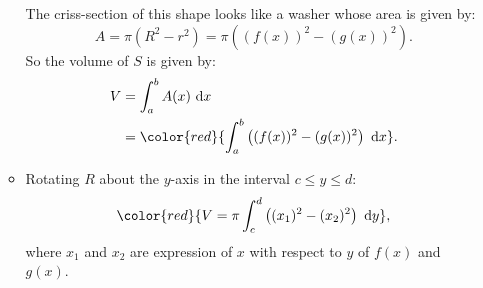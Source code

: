 \documentclass[12pt, a4paper]{article}
\def\d{{\mathrm{d}}}
\begin{document}
\begin{enumerate}
\begin{itemize}
        The criss-section of this shape looks like a washer whose area is given by: $$A=\pi(R^2-r^2)=\pi\left(\left(f(x)\right)^2-\left(g(x)\right)^2\right).$$
        So the volume of $S$ is given by: 
        $$\begin{aligned}
            V&=\int_a^bA(x)\ \d x\\
            &={\color{red}{\int_a^b\left((f(x))^2-(g(x))^2\right)\ \d x}}.
        \end{aligned}$$
        \item Rotating $R$ about the $y$-axis in the interval $c\leq y\leq d$: 
        $${\color{red}{V=\pi\int_c^d\left((x_1)^2-(x_2)^2\right)\ \d y}},$$
        where $x_1$ and $x_2$ are expression of $x$ with respect to $y$ of $f(x)$ and $g(x)$.
    \end{itemize}
\end{enumerate}
\end{document}
